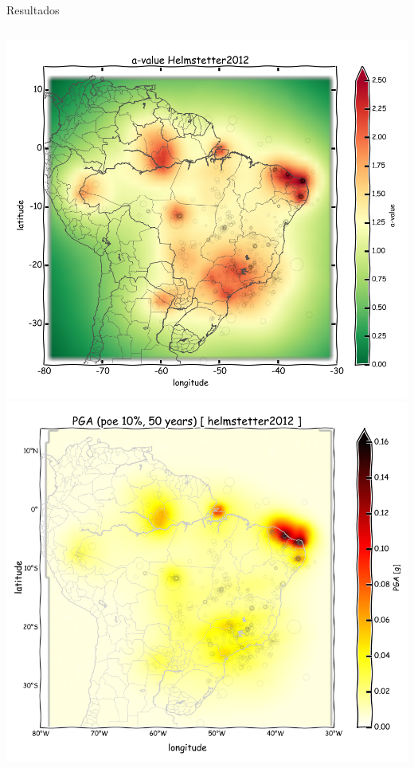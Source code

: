 \documentclass[ucs,8pt]{beamer}
\begin{document}
\begin{frame}{Resultados}
\begin{columns}
	\begin{column}[T]{.24\textwidth}
		\includegraphics[width=1\textwidth]{a_helmstetter} \\
		\includegraphics[width=1\textwidth]{pga_helmstetter}
	\end{column}
	
\end{columns}


\end{frame}
\end{document}
